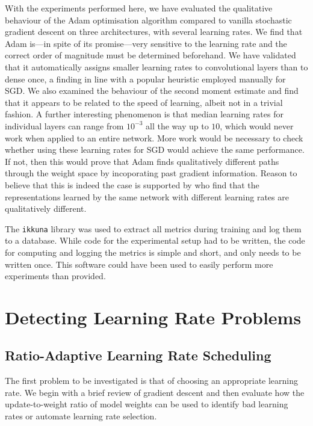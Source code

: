 With the experiments performed here, we have evaluated the qualitative behaviour
of the Adam optimisation algorithm compared to vanilla stochastic gradient
descent on three architectures, with several learning rates. We find that Adam
is---in spite of its promise---very sensitive to the learning rate and the
correct order of magnitude must be determined beforehand. We have validated that
it automatically assigns smaller learning rates to convolutional layers than to
dense once, a finding in line with a popular heuristic employed manually for
SGD. We also examined the behaviour of the second moment estimate and find that
it appears to be related to the speed of learning, albeit not in a trivial
fashion. A further interesting phenomenon is that median learning rates for
individual layers can range from $10^{-3}$ all the way up to $10$, which would
never work when applied to an entire network. More work would be necessary to
check whether using these learning rates for SGD would achieve the same
performance. If not, then this would prove that Adam finds qualitatively
different paths through the weight space by incoporating past gradient
information. Reason to believe that this is indeed the case is supported by
\citet{NIPS2018_7815} who find that the representations learned by the same
network with different learning rates are qualitatively different.

The \texttt{ikkuna} library was used to extract all metrics during training and
log them to a database. While code for the experimental setup had to be written,
the code for computing and logging the metrics is simple and short, and only
needs to be written once. This software could have been used to easily perform
more experiments than \citet{kingma2014adam} provided.

\section{Detecting Learning Rate Problems}%
\label{sec:detecting_learning_rate_problems}

\subsection{Ratio-Adaptive Learning Rate Scheduling}%
\label{sub:ratio_adaptive_learning_rate_scheduling}

The first problem to be investigated is that of choosing an appropriate learning
rate. We begin with a brief review of gradient descent and then evaluate how
the update-to-weight ratio of model weights can be used to identify bad learning
rates or automate learning rate selection.

